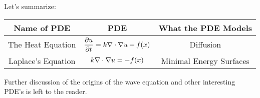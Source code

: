 Let's summarize:
\begin{center}
    \begin{tabular}{|c|c|c|}
        \hline
        Name of PDE & PDE & What the PDE Models \\ \hline \hline
        The Heat Equation & $\displaystyle \frac{\partial{u}}{\partial{t}} = k \nabla \cdot \nabla u + f(x)$ & Diffusion \\
        Laplace's Equation & $\displaystyle k \nabla \cdot \nabla u =-f(x)$ & Minimal Energy
        Surfaces \\
        \hline
    \end{tabular}
\end{center}

Further discussion of the origins of the wave equation and other interesting PDE's is left
to the reader.


